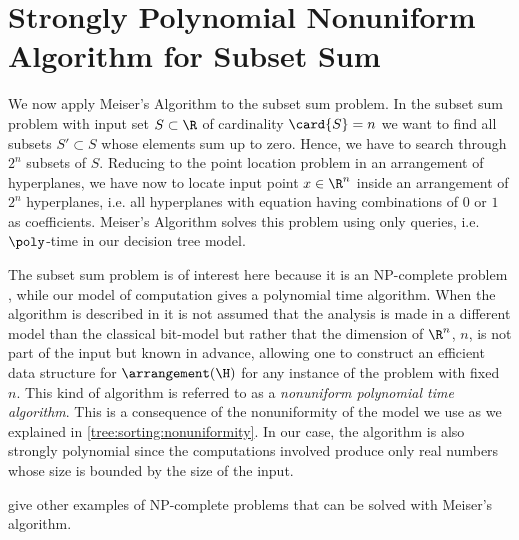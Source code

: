 \section{Strongly Polynomial Nonuniform Algorithm for Subset Sum}

We now apply Meiser's Algorithm to the subset sum problem. In the subset sum
problem with input set $S \subset \R$ of cardinality $\card{S} = n$ we want to
find all subsets $S' \subset S$ whose elements sum up to zero. Hence, we have
to search through $2^n$ subsets of $S$. Reducing to the point location problem
in an arrangement of hyperplanes, we have now to locate input point $x \in
\R^n$ inside an arrangement of $2^n$ hyperplanes, i.e. all hyperplanes with
equation having combinations of $0$ or $1$ as coefficients. Meiser's Algorithm
solves this problem using only  queries, i.e. $\poly$-time
in our decision tree model.

The subset sum problem is of interest here because it is an NP-complete problem
\cite{karp:1972}, while our model of computation gives a polynomial time
algorithm. When the algorithm is described in \cite{burgisser:1997} it is not
assumed that the analysis is made in a different model than the classical
bit-model but rather that the dimension of $\R^n$, $n$, is not part of the input
but known in advance, allowing one to construct an efficient data structure for
$\arrangement(\H)$ for any instance of the problem with fixed $n$. This kind of
algorithm is referred to as a \emph{nonuniform polynomial time algorithm}.
This is a consequence of the nonuniformity of the model we use as we explained
in \ref{tree:sorting:nonuniformity}. In our case, the algorithm is
also strongly polynomial since the computations involved produce only real
numbers whose size is bounded by the size of the input.

\citet*{meiser:1993,burgisser:1997} give other examples of
NP-complete problems that can be solved with Meiser's algorithm.
